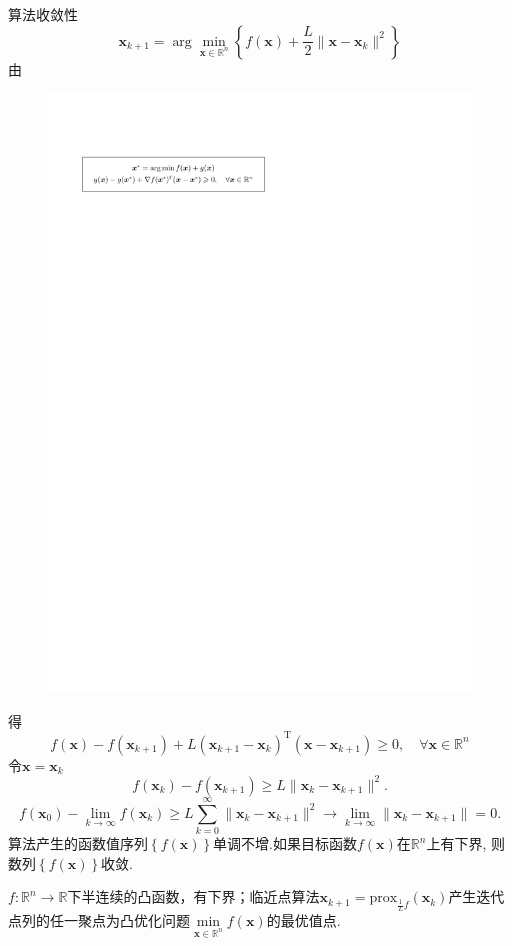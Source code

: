 \begin{note}
    算法收敛性
    \[
        \boldsymbol{x}_{k+1}=\arg\min_{\boldsymbol{x}\in\mathbb{R}^n}\left\{f(\boldsymbol{x})+\frac{L}{2}\|\boldsymbol{x}-\boldsymbol{x}_k\|^2\right\}
    \]
    由
    \begin{figure}[H]
        \centering
        \includegraphics{image/临近点算子收敛性.pdf}
    \end{figure}
    得
    \[
        f(\boldsymbol{x})-f(\boldsymbol{x}_{k+1})+L(\boldsymbol{x}_{k+1}-\boldsymbol{x}_k)^\mathrm{T}(\boldsymbol{x}-\boldsymbol{x}_{k+1})\geqslant0,\quad\forall\boldsymbol{x}\in\mathbb{R}^n
    \]
    令$\boldsymbol{x} = \boldsymbol{x}_{k}$
    \[
        f(\boldsymbol{x}_k)-f(\boldsymbol{x}_{k+1})\geqslant L\|\boldsymbol{x}_k-\boldsymbol{x}_{k+1}\|^2.
    \]
    \[
        f(\boldsymbol{x}_0)-\lim_{k\to\infty}f(\boldsymbol{x}_k)\geqslant L\sum_{k=0}^\infty\|\boldsymbol{x}_k-\boldsymbol{x}_{k+1}\|^2\longrightarrow\lim_{k\to\infty}\|\boldsymbol{x}_k-\boldsymbol{x}_{k+1}\|=0.
    \]
    算法产生的函数值序列$\left\{ f(\boldsymbol{x}) \right\}$单调不增.如果目标函数$f(\boldsymbol{x})$在$\mathbb{R}^n$上有下界, 则数列$\left\{ f(\boldsymbol{x}) \right\}$收敛. 
\end{note}
\begin{theorem}
    $f:\mathbb{R}^n\to\mathbb{R}$下半连续的凸函数，有下界；临近点算法$\boldsymbol{x}_{k+1}=\mathrm{prox}_{\frac1Lf}(\boldsymbol{x}_k)$产生迭代点列的任一聚点为凸优化问题$\min\limits_{\boldsymbol{x}\in\mathbb{R}^{n}}f(\boldsymbol{x})$的最优值点.

\end{theorem}
